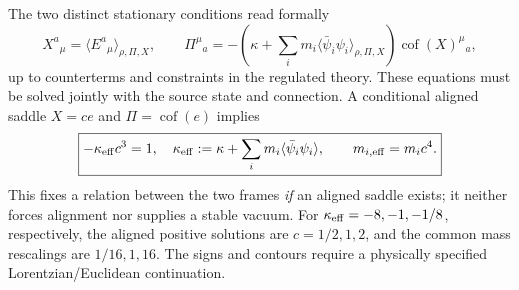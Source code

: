 \documentclass[11pt,a4paper]{article}
\begin{document}
The two distinct stationary conditions read formally
\begin{equation}\label{eq:v15-eulers}
\boxed{X^a{}_{\mu}=\langle E^a{}_{\mu}\rangle_{\rho,\Pi,X},\qquad
\Pi^\mu{}_a=-\left(\kappa+\sum_i m_i\langle\bar\psi_i\psi_i\rangle_{\rho,\Pi,X}\right)\operatorname{cof}(X)^\mu{}_a,}
\end{equation}
up to counterterms and constraints in the regulated theory. These equations must be solved jointly with the source state and connection. A conditional aligned saddle $X=c e$ and $\Pi=\operatorname{cof}(e)$ implies
\begin{equation}\label{eq:v15-c}
\boxed{-\kappa_{\rm eff}c^3=1,\quad \kappa_{\rm eff}:=\kappa+\sum_i m_i\langle\bar\psi_i\psi_i\rangle,
\qquad m_{i,\rm eff}=m_i c^4.}
\end{equation}
This fixes a relation between the two frames \emph{if} an aligned saddle exists; it neither forces alignment nor supplies a stable vacuum. For $\kappa_{\rm eff}=-8,-1,-1/8$, respectively, the aligned positive solutions are $c=1/2,1,2$, and the common mass rescalings are $1/16,1,16$. The signs and contours require a physically specified Lorentzian/Euclidean continuation.
\end{document}
